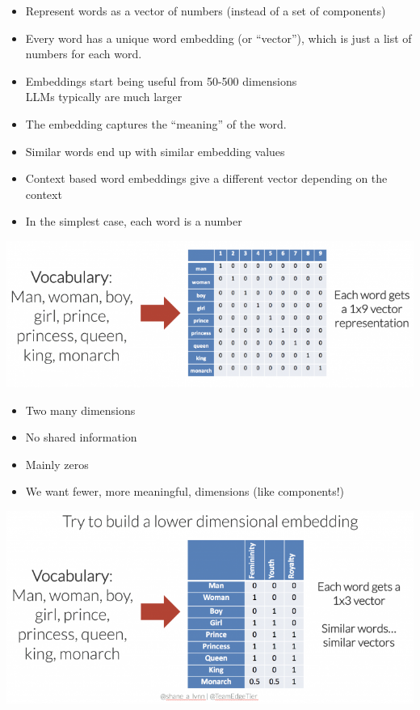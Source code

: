 \documentclass[a4paper,landscape,headrule,footrule,xetex]{foils}
\begin{document}


\begin{itemize}
\item Represent words as a vector of numbers (instead of a set of components)
\item Every word has a unique word embedding (or “vector”), which is
  just a list of numbers for each word.  
\item Embeddings start being useful from 50-500 dimensions
  \\ LLMs typically are much larger
\item The embedding captures the  “meaning” of the word. 
\item  Similar words end up with similar embedding values
\item Context based word embeddings give a different vector depending
  on the context 

\end{itemize}

\begin{itemize}
\item In the simplest case, each word is a number
\end{itemize}
\includegraphics[width=\linewidth]{pics/one-hot-word-embedding-vectors-768x276.png}
\begin{itemize}\addtolength{\itemsep}{-2ex}
\item Two many dimensions
\item No shared information
\item Mainly zeros
\end{itemize}
\newpage
\begin{itemize}
\item We want fewer, more meaningful, dimensions (like components!) 
\end{itemize}
\includegraphics[width=\linewidth]{pics/3-dimensional-word-embeddings-example-768x362.png}
\end{document}
